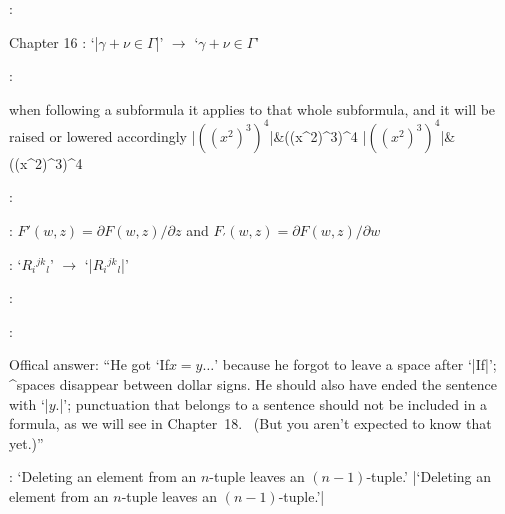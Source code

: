 :
\begintt
\newcount\notenumber
\def\clearnotenumber{\notenumber=0\relax}
\def\note{\advance\notenumber by 1
\footnote{$^{\the\notenumber}$}}
\endtt
\borderedbox{\def\clearnotenumber{\notenumber=0\relax}
\def\note{\advance\notenumber by 1
\footnote{$^{\the\notenumber}$}}
}
\myhr
\vfill
\eject


\noindent Chapter 16
\myhr
{}:
`|$\gamma + \nu \in \Gamma$|' $\rightarrow$ `$\gamma + \nu \in \Gamma$'

:
\halign{\indent\hfil#\ &\ #\hfil\cr
$\leq$ & |\leq|\cr
$\geq$ & |\geq|\cr
$\ne$ & |\ne|\cr
}

\myhr

\item\bull when following a subformula it applies to that whole subformula, and
it will be raised or lowered accordingly
\beginmathdemo
|$((x^2)^3)^4$|&((x^2)^3)^4\cr
|${({(x^2)}^3)}^4$|&{({(x^2)}^3)}^4\cr
\endmathdemo

\myhr
{}:

:
$F'(w,z)=\partial F(w,z)/\partial z$ and $F_\prime(w,z)=\partial F(w,z)/
\partial w$

:
`$R_i{}^{jk}{}_l$' $\rightarrow$ `|$R_i{}^{jk}{}_l$|'

:

:

Offical answer: ``He got `If$ x = y\ldots$' because he forgot to leave
a space after `|If|'; ^{spaces} disappear between dollar signs. He
should also have ended the sentence with `|$y$.|'; punctuation that
belongs to a sentence should not be included in a formula, as we will
see in Chapter~18. \ (But you aren't expected to know that yet.)''

:
`Deleting an element from an $n$-tuple leaves an $(n-1)$-tuple.'\parbreak
|`Deleting an element from an $n$-tuple leaves an $(n-1)$-tuple.'|

